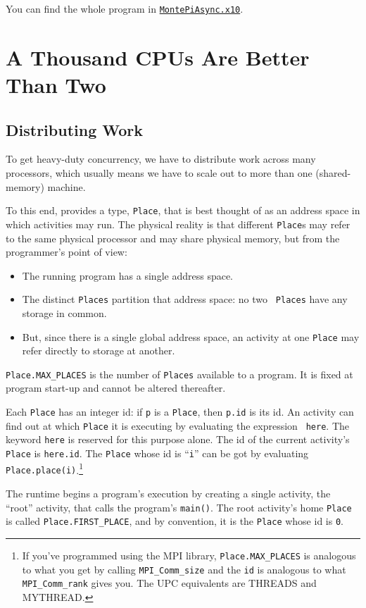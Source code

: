 You can find the whole program in
\href{http://dist.codehaus.org/x10/documentation/guide/src/montePi/MontePiAsync.x10}{\tt MontePiAsync.x10}.


\section{A Thousand CPUs Are Better Than Two}
\subsection{Distributing Work}\label{sec:distwork}
To get heavy-duty concurrency, we have to distribute work across many
processors, which usually means we have to scale out to more than one
(shared-memory) machine.

To this end, \Xten{} provides a type, {\tt Place}, that is best thought of as
an address space in which activities may run.
The physical reality is that different {\tt Place}s may refer to the same
physical processor and may share physical memory, but from the programmer's
point of view:
\begin{itemize}
\item The running program has a single address space.
\item The distinct {\tt Places} partition that address space: no two {\tt
Places} have any storage in common.
\item But, since there is a single global address space, an activity at one
{\tt Place} may refer directly to storage at another.
\end{itemize}   

{\tt Place.MAX\_PLACES} is the number of {\tt Places} available to a program.  It is fixed
at program start-up and cannot be altered thereafter.

Each {\tt Place} has an integer id:
if {\tt p} is a {\tt Place}, then {\tt p.id} is its id.  An activity can find
out at which {\tt Place} it is executing by evaluating the expression {\tt
here}.  The keyword {\tt here} is reserved for this purpose alone.  The id of
the current activity's {\tt Place} is {\tt here.id}. The {\tt Place} whose id 
is ``{\tt i}'' can be got by evaluating {\tt Place.place(i)}.\footnote{
If you've programmed using the MPI
library,  {\tt Place.MAX\_PLACES} is analogous to
what you get by calling {\tt MPI\_Comm\_size} and the {\tt id} is analogous to
what {\tt MPI\_Comm\_rank} gives you.  The UPC equivalents are THREADS and MYTHREAD.
}

The \Xten{} runtime begins a program's execution by creating a single activity, the
``root'' activity, that calls
the program's {\tt main()}.  The root activity's home {\tt Place} is called
{\tt Place.FIRST\_PLACE}, and by convention, it is the {\tt Place} whose id is
{\tt 0}.

